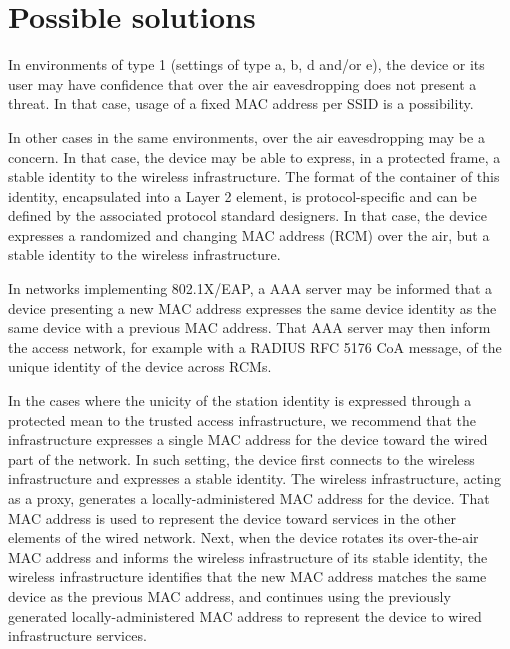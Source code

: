 \documentclass[10pt]{article}
\begin{document}
{\section{Possible solutions}

In environments of type 1 (settings of type a, b, d and/or e), the device or its user may have confidence that over the air eavesdropping does not present a threat. In that case, usage of a fixed MAC address per SSID is a possibility. 

In other cases in the same environments, over the air eavesdropping may be a concern. In that case, the device may be able to express, in a protected frame, a stable identity to the wireless infrastructure. The format of the container of this identity, encapsulated into a Layer 2 element, is protocol-specific and can be defined by the associated protocol standard designers. In that case, the device expresses a randomized and changing MAC address (RCM) over the air, but a stable identity to the wireless infrastructure. 

In networks implementing 802.1X/EAP, a AAA server may be informed that a device presenting a new MAC address expresses the same device identity as the same device with a previous MAC address. That AAA server may then inform the access network, for example with a RADIUS RFC 5176 CoA message, of the unique identity of the device across RCMs. 

In the cases where the unicity of the station identity is expressed through a protected mean to the trusted access infrastructure, we recommend that the infrastructure expresses a single MAC address for the device toward the wired part of the network. In such setting, the device first connects to the wireless infrastructure and expresses a stable identity. The wireless infrastructure, acting as a proxy, generates a locally-administered MAC address for the device. That MAC address is used to represent the device toward services in the other elements of the wired network. Next, when the device rotates its over-the-air MAC address and informs the wireless infrastructure of its stable identity, the wireless infrastructure identifies that the new MAC address matches the same device as the previous MAC address, and continues using the previously generated locally-administered MAC address to represent the device to wired infrastructure services.

}
\end{document}
